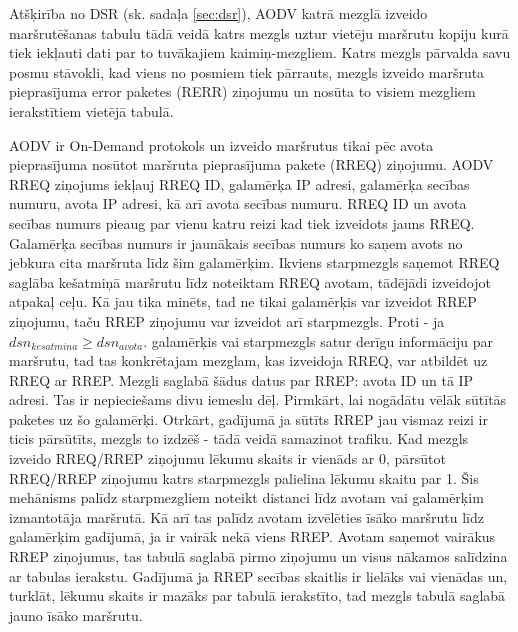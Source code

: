 Atšķirība no DSR (sk. sadaļa \ref{sec:dsr}), AODV katrā mezglā izveido maršrutēšanas tabulu tādā veidā katrs mezgls uztur vietēju maršrutu kopiju kurā tiek iekļauti dati par to tuvākajiem kaimiņ-mezgliem. Katrs mezgls pārvalda savu posmu stāvokli, kad viens no posmiem tiek pārrauts, mezgls izveido maršruta pieprasījuma error paketes (\acs{RERR}) ziņojumu un nosūta to visiem mezgliem ierakstītiem vietējā tabulā.

AODV ir On-Demand protokols un izveido maršrutus tikai pēc avota pieprasījuma nosūtot maršruta pieprasījuma pakete (\acs{RREQ}) ziņojumu. AODV RREQ ziņojums iekļauj RREQ ID, galamērķa IP adresi, galamērķa secības numuru, avota IP adresi, kā arī avota secības numuru. RREQ ID un avota secības numurs pieaug par vienu katru reizi kad tiek izveidots jauns RREQ. Galamērķa secības numurs ir jaunākais secības numurs ko saņem avots no jebkura cita maršruta līdz šim galamērķim. Ikviens starpmezgls saņemot RREQ saglāba kešatmiņā maršrutu līdz noteiktam RREQ avotam, tādējādi izveidojot atpakaļ ceļu. Kā jau tika minēts, tad ne tikai galamērķis var izveidot RREP ziņojumu, taču RREP ziņojumu var izveidot arī starpmezgls. Proti - ja $dsn_{kesatmina}\geq dsn_{avota}$. galamērķis vai starpmezgls satur derīgu informāciju par maršrutu, tad tas konkrētajam mezglam, kas izveidoja RREQ, var atbildēt uz RREQ ar RREP. Mezgli saglabā šādus datus par RREP: avota ID un tā IP adresi. Tas ir nepieciešams divu iemeslu dēļ. Pirmkārt, lai nogādātu vēlāk sūtītās paketes uz šo galamērķi. Otrkārt, gadījumā ja sūtīts RREP jau vismaz reizi ir ticis pārsūtīts, mezgls to izdzēš - tādā veidā samazinot trafiku. Kad mezgls izveido RREQ/RREP ziņojumu lēkumu skaits ir vienāds ar 0, pārsūtot RREQ/RREP  ziņojumu katrs starpmezgls palielina lēkumu skaitu par 1. Šis mehānisms palīdz starpmezgliem noteikt distanci līdz avotam vai galamērķim izmantotāja maršrutā. Kā arī tas palīdz avotam izvēlēties īsāko maršrutu līdz galamērķim gadījumā, ja ir vairāk nekā viens RREP. Avotam saņemot vairākus RREP ziņojumus, tas tabulā saglabā pirmo ziņojumu un visus nākamos salīdzina ar tabulas ierakstu. Gadījumā ja RREP secības skaitlis ir lielāks vai vienādas un, turklāt, lēkumu skaits ir mazāks par tabulā ierakstīto, tad mezgls tabulā saglabā jauno īsāko maršrutu.
